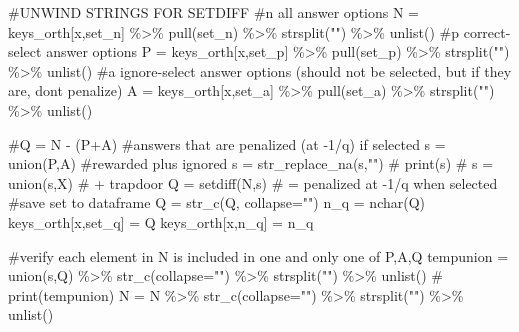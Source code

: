 \documentclass[
  letterpaper,
  DIV=11,
  numbers=noendperiod]{scrreprt}
\newenvironment{Shaded}{\begin{snugshade}}{\end{snugshade}}
\newcommand{\AttributeTok}[1]{\textcolor[rgb]{0.40,0.45,0.13}{#1}}
\newcommand{\CommentTok}[1]{\textcolor[rgb]{0.37,0.37,0.37}{#1}}
\newcommand{\FunctionTok}[1]{\textcolor[rgb]{0.28,0.35,0.67}{#1}}
\newcommand{\NormalTok}[1]{\textcolor[rgb]{0.00,0.23,0.31}{#1}}
\newcommand{\OtherTok}[1]{\textcolor[rgb]{0.00,0.23,0.31}{#1}}
\newcommand{\SpecialCharTok}[1]{\textcolor[rgb]{0.37,0.37,0.37}{#1}}
\newcommand{\StringTok}[1]{\textcolor[rgb]{0.13,0.47,0.30}{#1}}
\begin{document}
\begin{Shaded}
\begin{Highlighting}[]
  \CommentTok{\#UNWIND STRINGS FOR SETDIFF}
  \CommentTok{\#n all answer options}
\NormalTok{  N }\OtherTok{=}\NormalTok{ keys\_orth[x,}\StringTok{\textquotesingle{}set\_n\textquotesingle{}}\NormalTok{] }\SpecialCharTok{\%\textgreater{}\%} \FunctionTok{pull}\NormalTok{(set\_n) }\SpecialCharTok{\%\textgreater{}\%} \FunctionTok{strsplit}\NormalTok{(}\StringTok{""}\NormalTok{) }\SpecialCharTok{\%\textgreater{}\%} \FunctionTok{unlist}\NormalTok{()}
  \CommentTok{\#p correct{-}select answer options}
\NormalTok{  P }\OtherTok{=}\NormalTok{ keys\_orth[x,}\StringTok{\textquotesingle{}set\_p\textquotesingle{}}\NormalTok{] }\SpecialCharTok{\%\textgreater{}\%} \FunctionTok{pull}\NormalTok{(set\_p) }\SpecialCharTok{\%\textgreater{}\%} \FunctionTok{strsplit}\NormalTok{(}\StringTok{""}\NormalTok{) }\SpecialCharTok{\%\textgreater{}\%} \FunctionTok{unlist}\NormalTok{()}
  \CommentTok{\#a ignore{-}select answer options (should not be selected, but if they are, don\textquotesingle{}t penalize)}
\NormalTok{  A }\OtherTok{=}\NormalTok{ keys\_orth[x,}\StringTok{\textquotesingle{}set\_a\textquotesingle{}}\NormalTok{] }\SpecialCharTok{\%\textgreater{}\%} \FunctionTok{pull}\NormalTok{(set\_a) }\SpecialCharTok{\%\textgreater{}\%} \FunctionTok{strsplit}\NormalTok{(}\StringTok{""}\NormalTok{) }\SpecialCharTok{\%\textgreater{}\%} \FunctionTok{unlist}\NormalTok{() }
 
  \CommentTok{\#Q = N {-} (P+A)}
  \CommentTok{\#answers that are penalized (at {-}1/q) if selected }
\NormalTok{  s }\OtherTok{=} \FunctionTok{union}\NormalTok{(P,A) }\CommentTok{\#rewarded plus ignored }
\NormalTok{  s }\OtherTok{=} \FunctionTok{str\_replace\_na}\NormalTok{(s,}\StringTok{""}\NormalTok{)}
  \CommentTok{\# print(s)}
  \CommentTok{\# s = union(s,X) \# + trapdoor }
\NormalTok{  Q }\OtherTok{=} \FunctionTok{setdiff}\NormalTok{(N,s) }\CommentTok{\# = penalized at {-}1/q when selected }
  \CommentTok{\#save set to dataframe}
\NormalTok{  Q }\OtherTok{=} \FunctionTok{str\_c}\NormalTok{(Q, }\AttributeTok{collapse=}\StringTok{""}\NormalTok{)}
\NormalTok{  n\_q }\OtherTok{=} \FunctionTok{nchar}\NormalTok{(Q)}
\NormalTok{  keys\_orth[x,}\StringTok{\textquotesingle{}set\_q\textquotesingle{}}\NormalTok{] }\OtherTok{=}\NormalTok{ Q}
\NormalTok{  keys\_orth[x,}\StringTok{\textquotesingle{}n\_q\textquotesingle{}}\NormalTok{] }\OtherTok{=}\NormalTok{ n\_q}
  
  \CommentTok{\#verify each element in N is included in one and only one of P,A,Q}
\NormalTok{  tempunion }\OtherTok{=} \FunctionTok{union}\NormalTok{(s,Q) }\SpecialCharTok{\%\textgreater{}\%} \FunctionTok{str\_c}\NormalTok{(}\AttributeTok{collapse=}\StringTok{""}\NormalTok{) }\SpecialCharTok{\%\textgreater{}\%} \FunctionTok{strsplit}\NormalTok{(}\StringTok{""}\NormalTok{) }\SpecialCharTok{\%\textgreater{}\%} \FunctionTok{unlist}\NormalTok{()}
  \CommentTok{\# print(tempunion)}
\NormalTok{  N }\OtherTok{=}\NormalTok{ N }\SpecialCharTok{\%\textgreater{}\%} \FunctionTok{str\_c}\NormalTok{(}\AttributeTok{collapse=}\StringTok{""}\NormalTok{) }\SpecialCharTok{\%\textgreater{}\%} \FunctionTok{strsplit}\NormalTok{(}\StringTok{""}\NormalTok{) }\SpecialCharTok{\%\textgreater{}\%} \FunctionTok{unlist}\NormalTok{()}


\end{Highlighting}
\end{Shaded}
\end{document}

